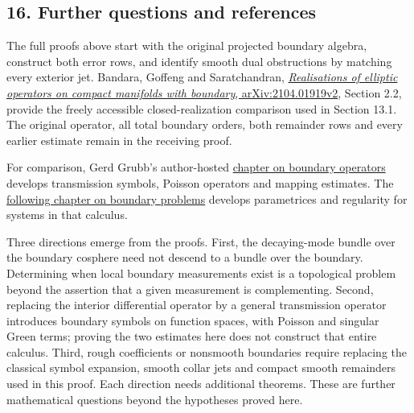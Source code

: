 \documentclass[
  11pt,
]{article}
\begin{document}
\subsection{16. Further questions and
references}\label{further-questions-and-references}

The full proofs above start with the original projected boundary
algebra, construct both error rows, and identify smooth dual
obstructions by matching every exterior jet. Bandara, Goffeng and
Saratchandran,
\href{https://arxiv.org/abs/2104.01919v2}{\emph{Realisations of elliptic
operators on compact manifolds with boundary}, arXiv:2104.01919v2},
Section 2.2, provide the freely accessible closed-realization comparison
used in Section 13.1. The original operator, all total boundary orders,
both remainder rows and every earlier estimate remain in the receiving
proof.

For comparison, Gerd Grubb's author-hosted
\href{https://web.math.ku.dk/~grubb/dist10n.pdf}{chapter on boundary
operators} develops transmission symbols, Poisson operators and mapping
estimates. The
\href{https://web.math.ku.dk/~grubb/dist11n.pdf}{following chapter on
boundary problems} develops parametrices and regularity for systems in
that calculus.

Three directions emerge from the proofs. First, the decaying-mode bundle
over the boundary cosphere need not descend to a bundle over the
boundary. Determining when local boundary measurements exist is a
topological problem beyond the assertion that a given measurement is
complementing. Second, replacing the interior differential operator by a
general transmission operator introduces boundary symbols on function
spaces, with Poisson and singular Green terms; proving the two estimates
here does not construct that entire calculus. Third, rough coefficients
or nonsmooth boundaries require replacing the classical symbol
expansion, smooth collar jets and compact smooth remainders used in this
proof. Each direction needs additional theorems. These are further
mathematical questions beyond the hypotheses proved here.
\end{document}
